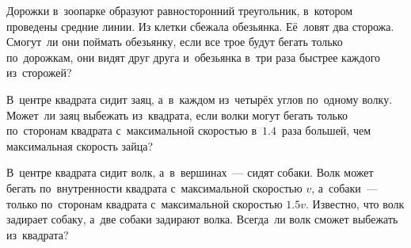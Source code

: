 \begin{problems}
\item
Дорожки в~зоопарке образуют равносторонний треугольник, в~котором проведены
средние линии.
Из клетки сбежала обезьянка.
Её~ловят два сторожа.
Смогут~ли они поймать обезьянку, если все трое будут бегать только по~дорожкам,
они видят друг друга и~обезьянка в~три раза быстрее каждого из~сторожей?

\item
В~центре квадрата сидит заяц, а~в~каждом из~четырёх углов по~одному волку.
Может~ли заяц выбежать из~квадрата, если волки могут бегать только по~сторонам
квадрата с~максимальной скоростью в~$1.4$~раза большей, чем максимальная
скорость зайца?

\item
В~центре квадрата сидит волк, а~в~вершинах~--- сидят собаки.
Волк может бегать по~внутренности квадрата с~максимальной скоростью $v$,
а~собаки~--- только по~сторонам квадрата с~максимальной скоростью $1.5v$.
Известно, что волк задирает собаку, а~две собаки задирают волка.
Всегда~ли волк сможет выбежать из~квадрата?

\end{problems}

